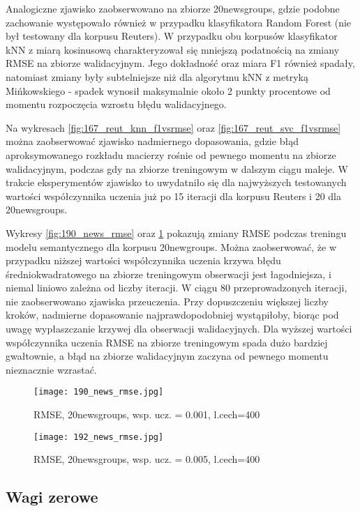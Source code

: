 \documentclass{pracamgr}
\begin{document}
Analogiczne zjawisko zaobserwowano na zbiorze 20newsgroups, gdzie podobne zachowanie występowało również w przypadku klasyfikatora Random Forest (nie był testowany dla korpusu Reuters). W przypadku obu korpusów klasyfikator kNN z miarą kosinusową charakteryzował się mniejszą podatnością na zmiany RMSE na zbiorze walidacyjnym. Jego dokładność oraz miara F1 również spadały, natomiast zmiany były subtelniejsze niż dla algorytmu kNN z metryką Mińkowskiego - spadek wynosił maksymalnie około 2 punkty procentowe od momentu rozpoczęcia wzrostu błędu walidacyjnego.

Na wykresach \ref{fig:167_reut_knn_f1vsrmse} oraz \ref{fig:167_reut_svc_f1vsrmse} można zaobserwować zjawisko nadmiernego dopasowania, gdzie błąd aproksymowanego rozkładu macierzy rośnie od pewnego momentu na zbiorze walidacyjnym, podczas gdy na zbiorze treningowym w dalszym ciągu maleje. W trakcie eksperymentów zjawisko to uwydatniło się dla najwyższych testowanych wartości współczynnika uczenia już po 15 iteracji dla korpusu Reuters i 20 dla 20newsgroups. 

Wykresy \ref{fig:190_news_rmse} oraz \ref{fig:192_news_rmse} pokazują zmiany RMSE podczas treningu modelu semantycznego dla korpusu 20newgroups. Można zaobserwować, że w przypadku niższej wartości współczynnika uczenia krzywa błędu średniokwadratowego na zbiorze treningowym obserwacji jest łagodniejsza, i niemal liniowo zależna od liczby iteracji. W ciągu 80 przeprowadzonych iteracji, nie zaobserwowano zjawiska przeuczenia. Przy dopuszczeniu większej liczby kroków, nadmierne dopasowanie najprawdopodobniej wystąpiłoby, biorąc pod uwagę wypłaszczanie krzywej dla obserwacji walidacyjnych. Dla wyższej wartości współczynnika uczenia RMSE na zbiorze treningowym spada dużo bardziej gwałtownie, a błąd na zbiorze walidacyjnym zaczyna od pewnego momentu nieznacznie wzrastać.

\begin{figure}[]
  \texttt{[image: 190\_news\_rmse.jpg]}
  \caption{RMSE, 20newsgroups, wsp. ucz. = 0.001, l.cech=400}\label{fig:190_news_rmse}
\endminipage\hfill
{}%
  \texttt{[image: 192\_news\_rmse.jpg]}
  \caption{RMSE, 20newsgroups, wsp. ucz. = 0.005, l.cech=400}\label{fig:192_news_rmse}
\endminipage\hfill
\end{figure}

\subsection{Wagi zerowe}
\end{document}
